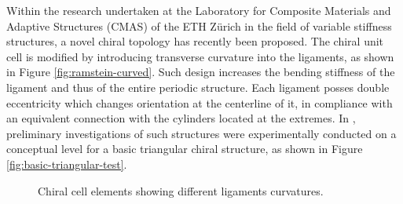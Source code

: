   Within the research undertaken at the Laboratory for Composite Materials and Adaptive Structures (CMAS) of the ETH Z\"urich in the field of variable stiffness structures, a novel chiral topology has recently been proposed. The chiral unit cell is modified by introducing transverse curvature into the ligaments, as shown in Figure \ref{fig:ramstein-curved}. Such design increases the bending stiffness of the ligament and thus of the entire periodic structure. Each ligament posses double eccentricity which changes orientation at the centerline of it, in compliance with an equivalent connection with the cylinders located at the extremes. In \cite{Ramstein2016}, preliminary investigations of such structures were experimentally conducted on a conceptual level for a basic triangular chiral structure, as shown in Figure \ref{fig:basic-triangular-test}.

  \begin{figure}[!htpb]
    \centering
     \qquad
    \caption[Chiral cell elements showing different ligaments curvatures]{Chiral cell elements showing different ligaments curvatures. \cite{Ramstein2016}}
    \label{fig:ramstein}
  \end{figure}

